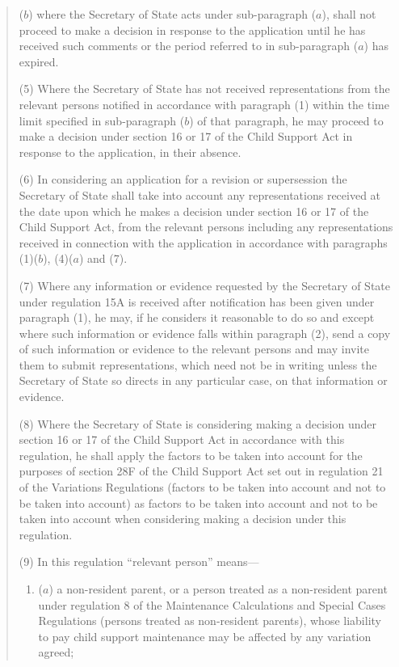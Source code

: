 \documentclass[12pt,a4paper]{article}
\begin{document}
\begin{quotation}
\begin{enumerate}
($b$) where the Secretary of State acts under sub-paragraph ($a$), shall not proceed to make a decision in response to the application until he has received such comments or the period referred to in sub-paragraph ($a$)  has expired.
\end{enumerate}

(5) Where the Secretary of State has not received representations from the relevant persons notified in accordance with paragraph (1) within the time limit specified in sub-paragraph ($b$)  of that paragraph, he may proceed to make a decision under section 16 or 17 of the Child Support Act in response to the application, in their absence.

(6) In considering an application for a revision or supersession the Secretary of State shall take into account any representations received at the date upon which he makes a decision under section 16 or 17 of the Child Support Act, from the relevant persons including any representations received in connection with the application in accordance with paragraphs (1)($b$), (4)($a$)  and (7).

(7) Where any information or evidence requested by the Secretary of State under regulation 15A is received after notification has been given under paragraph (1), he may, if he considers it reasonable to do so and except where such information or evidence falls within paragraph (2), send a copy of such information or evidence to the relevant persons and may invite them to submit representations, which need not be in writing unless the Secretary of State so directs in any particular case, on that information or evidence.

(8) Where the Secretary of State is considering making a decision under section 16 or 17 of the Child Support Act in accordance with this regulation, he shall apply the factors to be taken into account for the purposes of section 28F of the Child Support Act set out in regulation 21 of the Variations Regulations (factors to be taken into account and not to be taken into account) as factors to be taken into account and not to be taken into account when considering making a decision under this regulation.

(9) In this regulation “relevant person” means—
\begin{enumerate}\item[]
($a$) a non-resident parent, or a person treated as a non-resident parent under regulation 8 of the Maintenance Calculations and Special Cases Regulations (persons treated as non-resident parents), whose liability to pay child support maintenance may be affected by any variation agreed;


\end{enumerate}
\end{quotation}
\end{document}
